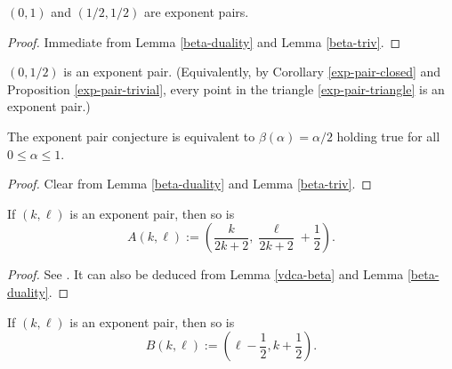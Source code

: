 \begin{proposition}\label{exp-pair-trivial}  $(0,1)$ and $(1/2,1/2)$ are exponent pairs.
\end{proposition}


\begin{proof} Immediate from Lemma \ref{beta-duality} and Lemma \ref{beta-triv}.
\end{proof}

\begin{conjecture}\label{exp-pair-conj}  $(0,1/2)$ is an exponent pair.  (Equivalently, by Corollary \ref{exp-pair-closed} and Proposition \ref{exp-pair-trivial}, every point in the triangle \eqref{exp-pair-triangle} is an exponent pair.)
\end{conjecture}



\begin{lemma}\label{exp-pair-conj-beta}  The exponent pair conjecture is equivalent to $\beta(\alpha)=\alpha/2$ holding true for all $0 \leq \alpha \leq 1$.
\end{lemma}

\begin{proof} Clear from Lemma \ref{beta-duality} and Lemma \ref{beta-triv}.
\end{proof}

\begin{proposition}\label{vdc-a}  If $(k,\ell)$ is an exponent pair, then so is
    $$A(k,\ell) := \left(\frac{k}{2k+2}, \frac{\ell}{2k+2} + \frac{1}{2}\right).$$
\end{proposition}

\literature
{}

\begin{proof} See \cite[Lemma 2.8]{ivic}. It can also be deduced from Lemma \ref{vdca-beta} and Lemma \ref{beta-duality}.
\end{proof}

\begin{proposition}\label{vdc-b}  If $(k,\ell)$ is an exponent pair, then so is
    $$B(k,\ell) := \left(\ell-\frac{1}{2}, k+\frac{1}{2}\right).$$
\end{proposition}

